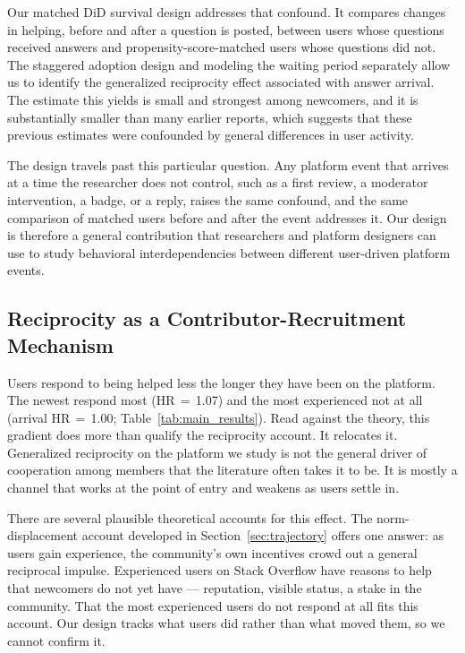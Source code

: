 Our matched DiD survival design addresses that confound. It compares changes in helping, before and after a question is posted, between users whose questions received answers and propensity-score-matched users whose questions did not. The staggered adoption design and modeling the waiting period separately allow us to identify the generalized reciprocity effect associated with answer arrival. The estimate this yields is small and strongest among newcomers, and it is substantially smaller than many earlier reports, which suggests that these previous estimates were confounded by general differences in user activity.

The design travels past this particular question. Any platform event that arrives at a time the researcher does not control, such as a first review, a moderator intervention, a badge, or a reply, raises the same confound, and the same comparison of matched users before and after the event addresses it. Our design is therefore a general contribution that researchers and platform designers can use to study behavioral interdependencies between different user-driven platform events.

\subsection{Reciprocity as a Contributor-Recruitment Mechanism}

Users respond to being helped less the longer they have been on the platform. The newest respond most (HR\,$=$\,1.07) and the most experienced not at all (arrival HR\,$=$\,1.00; Table~\ref{tab:main_results}). Read against the theory, this gradient does more than qualify the reciprocity account. It relocates it. Generalized reciprocity on the platform we study is not the general driver of cooperation among members that the literature often takes it to be. It is mostly a channel that works at the point of entry and weakens as users settle in.

There are several plausible theoretical accounts for this effect. The norm-displacement account developed in Section~\ref{sec:trajectory} offers one answer: as users gain experience, the community's own incentives crowd out a general reciprocal impulse. Experienced users on Stack Overflow have reasons to help that newcomers do not yet have --- reputation, visible status, a stake in the community. That the most experienced users do not respond at all fits this account. Our design tracks what users did rather than what moved them, so we cannot confirm it.


